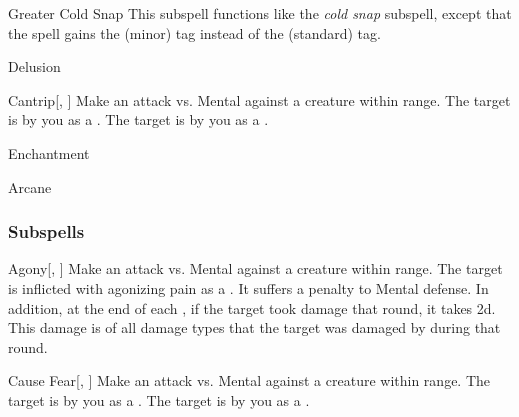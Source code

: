 \begin{ability}[\nth{4}]{Greater Cold Snap}
This subspell functions like the \textit{cold snap} subspell, except that the spell gains the  (minor) tag instead of the  (standard) tag.
\end{ability}
\vspace{0.25em}

\newpage
\begin{spellsection}{Delusion}

\begin{spellheader}
\end{spellheader}


\begin{ability}{Cantrip}[, ]
Make an attack vs. Mental against a creature within \rngmed range.
\hit The target is  by you as a .
\crit The target is  by you as a .
\end{ability}




 Enchantment

 Arcane
\end{spellsection}


\subsubsection{Subspells}


\begin{ability}[\nth{1}]{Agony}[, ]
Make an attack vs. Mental against a creature within \rngmed range.
\hit The target is inflicted with agonizing pain as a .
It suffers a  penalty to Mental defense.
In addition, at the end of each , if the target took damage that round, it takes  \minus2d.
This damage is of all damage types that the target was damaged by during that round.
\end{ability}
\vspace{0.25em}


\begin{ability}[\nth{1}]{Cause Fear}[, ]
Make an attack vs. Mental against a creature within \rngmed range.
\hit The target is \frightened by you as a .
\crit The target is \panicked by you as a .
\end{ability}
\vspace{0.25em}


